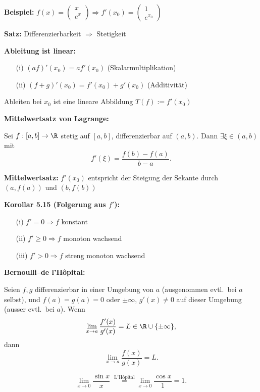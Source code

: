 \begin{itemize}
\textbf{Beispiel:} \(f(x) = \begin{pmatrix} x \\ e^x \end{pmatrix} \Rightarrow f'(x_0) = \begin{pmatrix} 1 \\ e^{x_0} \end{pmatrix}\)

\textbf{Satz:}  
Differenzierbarkeit \(\Rightarrow\) Stetigkeit

\textbf{Ableitung ist linear:}
\begin{itemize}
  \item[(i)] \( (a f)'(x_0) = a f'(x_0) \) \quad (Skalarmultiplikation)
  \item[(ii)] \( (f + g)'(x_0) = f'(x_0) + g'(x_0) \) \quad (Additivität)
\end{itemize}
Ableiten bei \(x_0\) ist eine lineare Abbildung \(T(f) := f'(x_0)\)

\textbf{Mittelwertsatz von Lagrange:}
\begin{theorem}
  Sei $f:[a,b]\to\R$ stetig auf $[a,b]$, differenzierbar auf $(a,b)$. Dann $\exists\xi\in(a,b)$ mit
  \[
    f'(\xi) = \frac{f(b)-f(a)}{b-a}.
  \]
\end{theorem}

\textbf{Mittelwertsatz:}  
\(f'(x_0)\) entspricht der Steigung der Sekante durch \((a, f(a))\) und \((b, f(b))\)

\textbf{Korollar 5.15 (Folgerung aus \(f'\)):}
\begin{itemize}
  \item[(i)] \(f' = 0 \Rightarrow f\) konstant
  \item[(ii)] \(f' \ge 0 \Rightarrow f\) monoton wachsend
  \item[(iii)] \(f' > 0 \Rightarrow f\) streng monoton wachsend
\end{itemize}


\textbf{Bernoulli–de l’Hôpital:}
\begin{theorem}
  Seien $f,g$ differenzierbar in einer Umgebung von $a$ (ausgenommen evtl.\ bei $a$ selbst), und $f(a)=g(a)=0$ oder $\pm\infty$, $g'(x)\ne0$ auf dieser Umgebung (ausser evtl.\ bei $a$). Wenn
  \[
    \lim_{x\to a} \frac{f'(x)}{g'(x)} = L \in \R \cup \{\pm\infty\},
  \]
  dann
  \[
    \lim_{x\to a} \frac{f(x)}{g(x)} = L.
  \]
\end{theorem}
\begin{example}
  \[
    \lim_{x\to0} \frac{\sin x}{x} 
    \;\stackrel{\text{L'Hôpital}}= 
    \lim_{x\to0} \frac{\cos x}{1} = 1.
  \]
\end{example}


\end{itemize}
